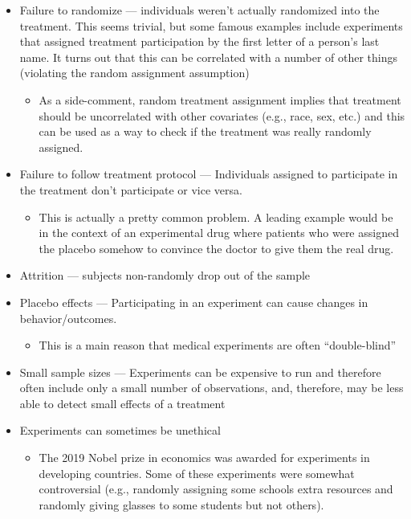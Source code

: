 \documentclass[
  letterpaper,
  DIV=11,
  numbers=noendperiod]{scrreprt}
\providecommand{\tightlist}{%
  \setlength{\itemsep}{0pt}\setlength{\parskip}{0pt}}\usepackage{longtable,booktabs,array}
\begin{document}
\begin{itemize}
\item
  Failure to randomize --- individuals weren't actually randomized into
  the treatment. This seems trivial, but some famous examples include
  experiments that assigned treatment participation by the first letter
  of a person's last name. It turns out that this can be correlated with
  a number of other things (violating the random assignment assumption)

  \begin{itemize}
  \tightlist
  \item
    As a side-comment, random treatment assignment implies that
    treatment should be uncorrelated with other covariates (e.g., race,
    sex, etc.) and this can be used as a way to check if the treatment
    was really randomly assigned.
  \end{itemize}
\item
  Failure to follow treatment protocol --- Individuals assigned to
  participate in the treatment don't participate or vice versa.

  \begin{itemize}
  \tightlist
  \item
    This is actually a pretty common problem. A leading example would be
    in the context of an experimental drug where patients who were
    assigned the placebo somehow to convince the doctor to give them the
    real drug.
  \end{itemize}
\item
  Attrition --- subjects non-randomly drop out of the sample
\item
  Placebo effects --- Participating in an experiment can cause changes
  in behavior/outcomes.

  \begin{itemize}
  \tightlist
  \item
    This is a main reason that medical experiments are often
    ``double-blind''
  \end{itemize}
\item
  Small sample sizes --- Experiments can be expensive to run and
  therefore often include only a small number of observations, and,
  therefore, may be less able to detect small effects of a treatment
\item
  Experiments can sometimes be unethical

  \begin{itemize}
  \tightlist
  \item
    The 2019 Nobel prize in economics was awarded for experiments in
    developing countries. Some of these experiments were somewhat
    controversial (e.g., randomly assigning some schools extra resources
    and randomly giving glasses to some students but not others).
  \end{itemize}
\end{itemize}
\end{document}
